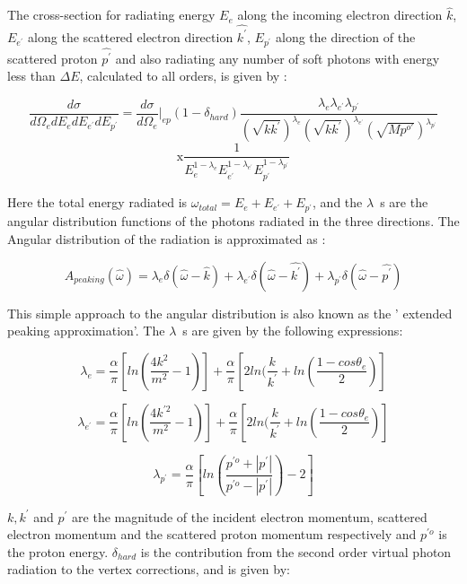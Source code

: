 The cross-section for radiating energy $E_{e}$ along the incoming electron direction $\hat{k}$, $E_{e^{'}}$ along the scattered electron direction $\hat{k^{'}}$, $E_{p^{'}}$ along the direction of the scattered proton $\hat{p^{'}}$ and also radiating any number of soft photons with energy less than $\Delta E $, calculated to all orders, is given by :

$$
\frac{d\sigma}{d\Omega_{e}dE_{e}dE_{e^{'}}dE_{p^{'}}} = \frac{d\sigma}
{d\Omega_{e}}\vert_{ep}(1-\delta_{hard}) \frac{\lambda_{e}\lambda_{e^{'}}
\lambda_{p^{'}}}{(\sqrt{kk^{'}})^{\lambda_{e}}(\sqrt{kk^{'}})^{\lambda_{e^{'}}}
(\sqrt{Mp^{o'}})^{\lambda_{p^{'}}}}
$$
\begin{equation}
\mbox{x}\frac{ 1 }{E_{e^{ }}^{1-\lambda_{e}}
E_{e^{'}}^{1-\lambda_{e^{'}}}E_{p^{'}}^{1-\lambda_{p^{'}}}} 
\end{equation}

Here the total energy radiated is $\omega_{total} = E_{e} + E_{e^{'}} + E_{p^{'}}$, and the $\lambda$~s are the angular distribution functions of the photons radiated in the three directions. The Angular distribution of the radiation is approximated as :

\begin{equation}
A_{peaking}(\hat{\omega}) = \lambda_{e}\delta(\hat{\omega} - \hat{k}) + \lambda_{e^{'}}\delta(\hat{\omega} - \hat{k^{'}}) + \lambda_{p^{'}}\delta(\hat{\omega} - \hat{p^{'}})
\end{equation}

This simple approach to the angular distribution is also known as the ' extended peaking approximation'. The $\lambda$~s are given by the following expressions:

\begin{equation}
\lambda_{e} = \frac{\alpha}{\pi}[ln(\frac{4k^{2}}{m^{2}} - 1)] + \frac{\alpha}{\pi}[2ln(\frac{k}{k^{'}} + ln(\frac{1 - cos\theta_{e}}{2})]
\end{equation}

\begin{equation}
\lambda_{e^{'}} = \frac{\alpha}{\pi}[ln(\frac{4k^{'2}}{m^{2}} - 1)] + \frac{\alpha}{\pi}[2ln(\frac{k}{k^{'}} + ln(\frac{1 - cos\theta_{e}}{2})]
\end{equation}

\begin{equation}
\lambda_{p^{'}} = \frac{\alpha}{\pi}[ln(\frac{p^{'o} + |p^{'}|} {p^{'o} - 
|p^{'}|}) - 2]
\end{equation}

$k, k^{'}$ and $ p^{'}$ are the magnitude of the incident electron momentum, scattered electron momentum and the scattered proton momentum respectively and $p^{'o}$ is the proton energy. $\delta_{hard}$ is the contribution from the second order virtual photon radiation to the vertex corrections, and is given by:

